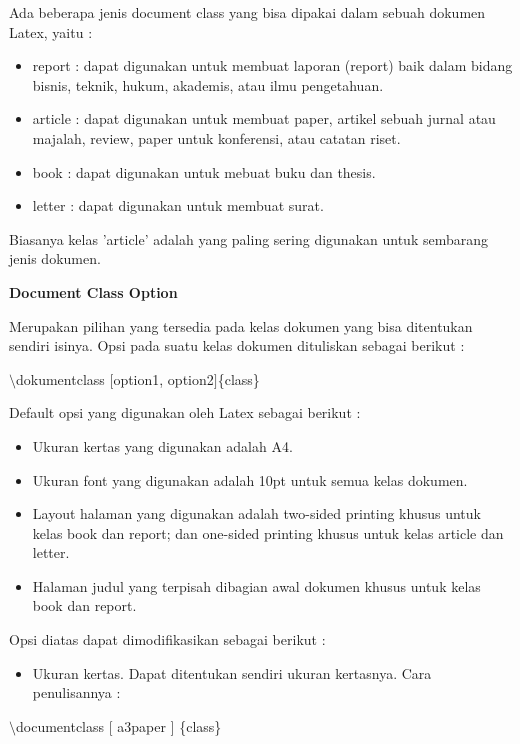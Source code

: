 Ada beberapa jenis document class yang bisa dipakai dalam sebuah dokumen Latex, yaitu :

\begin{itemize}
\item report : dapat digunakan untuk membuat laporan (report) baik dalam bidang bisnis, teknik, hukum, akademis, atau ilmu pengetahuan.
\item article : dapat digunakan untuk membuat paper, artikel sebuah jurnal atau majalah, review, paper untuk konferensi, atau catatan riset.
\item book : dapat digunakan untuk mebuat buku dan thesis.
\item letter : dapat digunakan untuk membuat surat.
\end{itemize}
\hspace{0,5in}Biasanya kelas 'article' adalah yang paling sering digunakan untuk sembarang jenis dokumen.\par \vspace{12pt}



\textbf{Document Class Option}\par \vspace{12pt}

Merupakan pilihan yang tersedia pada kelas dokumen yang bisa ditentukan sendiri isinya. Opsi pada suatu kelas dokumen dituliskan sebagai berikut :\par \vspace{12pt}

$\setminus$dokumentclass $[$option1, option2$]$\{class\}
\par \vspace{12pt}


Default opsi yang digunakan oleh Latex sebagai berikut :

\begin{itemize}
\item Ukuran kertas yang digunakan adalah A4.
\item Ukuran font yang digunakan adalah 10pt untuk semua kelas dokumen.
\item Layout halaman yang digunakan adalah two-sided printing khusus untuk kelas book dan report; dan one-sided printing khusus untuk kelas article dan letter.
\item Halaman judul yang terpisah dibagian awal dokumen khusus untuk kelas book dan report.
\end{itemize}
Opsi diatas dapat dimodifikasikan sebagai berikut :

\begin{itemize}
\item Ukuran kertas. Dapat ditentukan sendiri ukuran kertasnya. Cara 
penulisannya :
\end{itemize}
\hspace{0,5in}$\setminus$documentclass $[$ a3paper $]$ \{class\}

